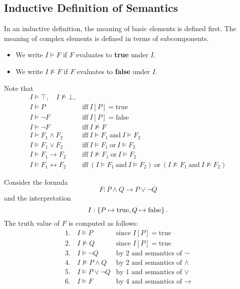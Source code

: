 \subsection{Inductive Definition of Semantics}
In an inductive definition, the meaning of basic elements is defined first.
The meaning of complex elements is defined in terms of subcomponents.
\begin{itemize}
	\item We write $I\models F$ if $F$ evaluates to \textbf{true} under $I$.
	\item We write $I\not\models F$ if $F$ evaluates to \textbf{false} under $I$.
\end{itemize}
Note that \[
\begin{array}{ll}
I\models \top,\quad I\not\models\bot, & \\
I\models P &\text{iff}\ I[P]=\text{true} \\
I\models \lnot F &\text{iff}\ I[P]=\text{false} \\
I\models\lnot F &\text{iff}\ I\not\models F \\
I\models F_1\land F_2 &\text{iff}\ I\models F_1\ \text{and}\ I\models F_2 \\
I\models F_1\lor F_2 &\text{iff}\ I\models F_1\ \text{or}\ I\models F_2 \\
I\models F_1\to F_2 &\text{iff}\ I\not\models F_1\ \text{or}\ I\models F_2 \\
I\models F_1\leftrightarrow F_2 &\text{iff}\ (I\models F_1\ \text{and}\ I\models F_2)\ \text{or}\ (I\not\models F_1\ \text{and}\ I\not\models F_2)
\end{array}
\]
\vspace{12pt}
\begin{example}
	Consider the formula \[
	F:P\land Q\to P\lor\lnot Q
	\] and the interpretation \[
	I:\set{P\mapsto\text{true},Q\mapsto\text{false}}.
	\] The truth value of $F$ is computed as follows: \[
	\begin{array}{ll}
		1.\quad I\models P &\text{since $I[P]=\text{true}$} \\
		2.\quad I\not\models Q &\text{since $I[P]=\text{true}$} \\
		3.\quad I\models \lnot Q &\text{by 2 and semantics of $\lnot$} \\
		4.\quad I\not\models P\land Q &\text{by 2 and semantics of $\land$} \\
		5.\quad I\models P\lor \lnot Q &\text{by 1 and semantics of $\lor$} \\
		6.\quad I\models F &\text{by 4 and semantics of $\to$} \\
	\end{array}
	\]
\end{example}

